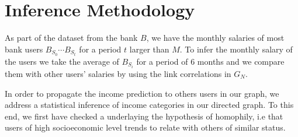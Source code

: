 \section{Inference Methodology}




As part of the dataset from the bank \( B \), we have the monthly salaries of most bank users \( B_{S_0} \cdots B_{S_t} \) for a period \( t \) larger than \( M \). To infer the monthly salary of the users we take the average of \( B_{S_i} \) for a period of \( 6 \) months and we compare them with other users' salaries by using the link correlations in \( G_N \).

In order to propagate the income prediction to others users in our graph, we address a statistical inference of income categories in our directed graph. To this end, we first have checked a underlaying the hypothesis of homophily, i.e that users of high socioeconomic level trends to relate with others of similar status.

